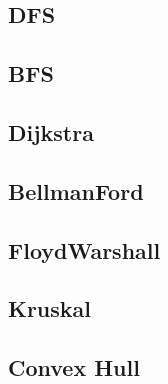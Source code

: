 \subsection{DFS}


\subsection{BFS}



\subsection{Dijkstra}


\subsection{BellmanFord}


\subsection{FloydWarshall}


\subsection{Kruskal}


\subsection{Convex Hull}



